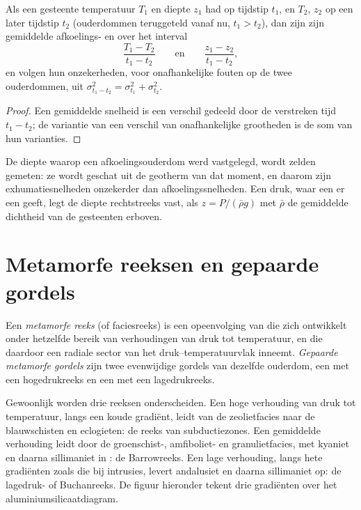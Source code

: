 \begin{proposition}\label{prop:b2:pt-paths:rates}
Als een gesteente temperatuur $T_1$ en diepte $z_1$ had op tijdstip $t_1$, en $T_2$, $z_2$ op een
later tijdstip $t_2$ (ouderdommen teruggeteld vanaf nu, $t_1 > t_2$), dan zijn zijn gemiddelde afkoelings- en
 over het interval
\[
\frac{T_1 - T_2}{t_1 - t_2}
\qquad\text{en}\qquad
\frac{z_1 - z_2}{t_1 - t_2},
\]
en volgen hun onzekerheden, voor onafhankelijke fouten op de twee ouderdommen, uit
$\sigma_{t_1 - t_2}^2 = \sigma_{t_1}^2 + \sigma_{t_2}^2$.
\end{proposition}

\begin{proof}
Een gemiddelde snelheid is een verschil gedeeld door de verstreken tijd $t_1 - t_2$; de variantie van een
verschil van onafhankelijke grootheden is de som van hun varianties.
\end{proof}

De diepte waarop een afkoelingsouderdom werd vastgelegd, wordt zelden gemeten: ze wordt geschat uit de
geotherm van dat moment, en daarom zijn exhumatiesnelheden onzekerder dan afkoelingssnelheden.
Een druk, waar een  er een geeft, legt de diepte rechtstreeks vast, als
$z = P/(\bar\rho g)$ met $\bar\rho$ de gemiddelde dichtheid van de gesteenten erboven.

\section{Metamorfe reeksen en gepaarde gordels}\label{sec:b2:pt-paths:series}

\begin{definition}\label{def:b2:pt-paths:series}
Een \emph{metamorfe reeks} (of faciesreeks) is een opeenvolging van
 die zich ontwikkelt onder hetzelfde bereik van verhoudingen van druk tot temperatuur,
en die daardoor een radiale sector van het druk--temperatuurvlak inneemt.
\emph{Gepaarde metamorfe gordels} zijn twee evenwijdige gordels van
dezelfde ouderdom, een met een hogedrukreeks en een met een lagedrukreeks.
\end{definition}

Gewoonlijk worden drie reeksen onderscheiden. Een hoge verhouding van druk tot temperatuur, langs een
koude gradiënt, leidt van de zeolietfacies naar de blauwschisten en eclogieten: de reeks
van subductiezones. Een gemiddelde verhouding leidt door de groenschist-, amfiboliet- en
granulietfacies, met kyaniet en daarna sillimaniet in : de Barrowreeks. Een lage
verhouding, langs hete gradiënten zoals die bij intrusies, levert andalusiet en daarna
sillimaniet op: de lagedruk- of Buchanreeks. De figuur hieronder tekent drie gradiënten
over het aluminiumsilicaatdiagram.


